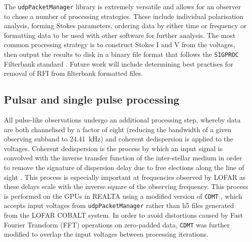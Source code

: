 The \texttt{udpPacketManager} library is extremely versatile and allows for an observer to chose a number of processing strategies. These include individual polarisation analysis, forming Stokes parameters, ordering data by either time or frequency or formatting data to be used with other software for further analysis. The most common processing strategy is to construct Stokes I and V from the voltages, then output the results to disk in a binary file format that follows the \texttt{SIGPROC} Filterbank standard \citep{Lorimer2011}. Future work will include determining best practises for removal of RFI from filterbank formatted files.


\subsection{Pulsar and single pulse processing}
\label{sec:pulsarproc}


All pulse-like observations undergo an additional processing step, whereby data are both channelised by a factor of eight (reducing the bandwidth of a given observing subband to 24.41~kHz) and coherent dedispersion is applied to the voltages.
Coherent dedispersion is the process by which an input signal is convolved with the inverse transfer function of the inter-stellar medium in order to remove the signature of dispersion delay due to free elections along the line of sight \citep{Hankins1987}. This process is especially important at frequencies observed by LOFAR as these delays scale with the inverse square of the observing frequency. This process is performed on the GPUs in REALTA using a modified version of \texttt{CDMT} \citep{Bassa2017}, which accepts input voltages from \texttt{udpPacketManager} rather than h5 files generated from the LOFAR COBALT system. In order to avoid distortions caused by Fast Fourier Transform (FFT) operations on zero-padded data, \texttt{CDMT} was further modified to overlap the input voltages between processing iterations.%

